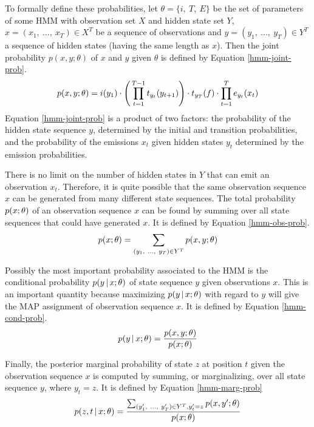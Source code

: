 To formally define these probabilities, let $\theta = \{i,\ T,\ E\}$ be
the set of parameters of some HMM with observation set $X$ and hidden
state set $Y$, $x = (x_1,\ ...,\ x_T) \in X^T$ be a sequence of
observations and $y = (y_1,\ ...,\ y_T) \in Y^T$ a sequence of hidden
states (having the same length as $x$). Then the joint probability
$p(x,y;\theta)$ of $x$ and $y$ given $\theta$ is defined by Equation
\eqref{hmm-joint-prob}.
\begin{equation}
p(x,y\mbox{$ ; \, $}\theta) = i(y_1) \cdot \Bigg( \prod_{t = 1}^{T-1} t_{y_t}(y_{t + 1})\Bigg) \cdot t_{y_T}(f) \cdot \prod_{t = 1}^T e_{y_t}(x_t)\label{hmm-joint-prob}
\end{equation}
Equation \eqref{hmm-joint-prob} is a product of two factors: the
probability of the hidden state sequence $y$, determined by the
initial and transition probabilities, and the probability of the
emissions $x_t$ given hidden states $y_t$ determined by the emission
probabilities.

There is no limit on the number of hidden states in $Y$ that can emit
an observation $x_t$. Therefore, it is quite possible that the same
observation sequence $x$ can be generated from many different state
sequences. The total probability $p(x\mbox{$ ; \, $}\theta)$ of an observation
sequence $x$ can be found by summing over all state sequences that
could have generated $x$. It is defined by Equation
\eqref{hmm-obs-prob}.
\begin{equation}
p(x\mbox{$ ; \, $}\theta) = \sum_{(y_1,\ ...,\ y_T) \in Y^T} p(x, y\mbox{$ ; \, $} \theta)\label{hmm-obs-prob}
\end{equation}

Possibly the most important probability associated to the HMM is the
conditional probability $p(y\mbox{$ \, | \, $} x\mbox{$ ; \, $}\theta)$ of state sequence $y$
given observations $x$. This is an important quantity because
maximizing $p(y\mbox{$ \, | \, $} x\mbox{$ ; \, $}\theta)$ with regard to $y$ will give the MAP
assignment of observation sequence $x$. It is defined by Equation
\eqref{hmm-cond-prob}.
\begin{equation}
p(y\mbox{$ \, | \, $} x\mbox{$ ; \, $}\theta) = \frac{p(x,y\mbox{$ ; \, $}\theta)}{p(x\mbox{$ ; \, $}\theta)}\label{hmm-cond-prob}
\end{equation}

Finally, the posterior marginal probability of state $z$ at position $t$ given
the observation sequence $x$ is computed by summing, or marginalizing,
over all state sequence $y$, where $y_t = z$. It is defined by
Equation \eqref{hmm-marg-prob}
\begin{equation}
p(z, t\mbox{$ \, | \, $} x\mbox{$ ; \, $} \theta) = \frac{\sum_{(y'_1,\ ...,\ y'_T) \in Y^T, y'_t = z} p(x, y'\mbox{$ ; \, $} \theta)}{p(x\mbox{$ ; \, $}\theta)}\label{hmm-marg-prob}
\end{equation}

